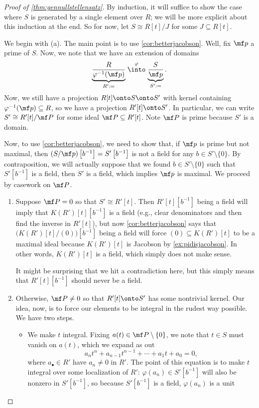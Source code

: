 \documentclass[../notes.tex]{subfiles}
\begin{document}
\begin{proof}[Proof of \autoref{thm:gennullstellensatz}]
	By induction, it will suffice to show the case where $S$ is generated by a single element over $R$; we will be more explicit about this induction at the end.
	So for now, let $S\cong R[t]/J$ for some $J\subseteq R[t]$.

	We begin with (a). The main point is to use \autoref{cor:betterjacobson}. Well, fix $\mf p$ a prime of $S$. Now, we note that we have an extension of domains
	\[\underbrace{\frac R{\varphi^{-1}(\mf p)}}_{R':=}\stackrel\varphi\into\underbrace{\frac S{\mf p}}_{S':=}.\]
	Now, we still have a projection $R[t]\onto S\onto S'$ with kernel containing $\varphi^{-1}(\mf p)\subseteq R$, so we have a projection $R'[t]\onto S'$. In particular, we can write $S'\cong R'[t]/\mf P$ for some ideal $\mf P\subseteq R'[t]$. Note $\mf P$ is prime because $S'$ is a domain.
	
	Now, to use \autoref{cor:betterjacobson}, we need to show that, if $\mf p$ is prime but not maximal, then $(S/\mf p)\left[b^{-1}\right]=S'\left[b^{-1}\right]$ is not a field for any $b\in S'\setminus\{0\}$. By contraposition, we will actually suppose that we found $b\in S'\setminus\{0\}$ such that $S'\left[b^{-1}\right]$ is a field, then $S'$ is a field, which implies $\mf p$ is maximal. We proceed by casework on $\mf P$.
	\begin{enumerate}[label=(\roman*)]
		\item Suppose $\mf P=0$ so that $S'\cong R'[t]$. Then $R'[t]\left[b^{-1}\right]$ being a field will imply that $K(R')[t]\left[b^{-1}\right]$ is a field (e.g., clear denominators and then find the inverse in $R'[t]$), but now \autoref{cor:betterjacobson} says that $\big(K(R')[t]/(0)\big)\left[b^{-1}\right]$ being a field will force $(0)\subseteq K(R')[t]$ to be a maximal ideal because $K(R')[t]$ is Jacobson by \autoref{ex:pidisjacobson}. In other words, $K(R')[t]$ is a field, which simply does not make sense.

		It might be surprising that we hit a contradiction here, but this simply means that $R'[t]\left[b^{-1}\right]$ should never be a field.

		\item Otherwise, $\mf P\ne0$ so that $R'[t]\onto S'$ has some nontrivial kernel. Our idea, now, is to force our elements to be integral in the rudest way possible. We have two steps.
		\begin{itemize}
			\item We make $t$ integral. Fixing $a(t)\in\mf P\setminus\{0\}$, we note that $t\in S$ must vanish on $a(t)$, which we expand as out
			\[a_nt^n+a_{n-1}t^{n-1}+\cdots+a_1t+a_0=0,\]
			where $a_\bullet\in R'$ have $a_n\ne0$ in $R'$. The point of this equation is to make $t$ integral over some localization of $R'$: $\varphi(a_n)\in S'\left[b^{-1}\right]$ will also be nonzero in $S'\left[b^{-1}\right]$, so because $S'\left[b^{-1}\right]$ is a field, $\varphi(a_n)$ is a unit
			

\end{itemize}
\end{enumerate}
\end{proof}
\end{document}
